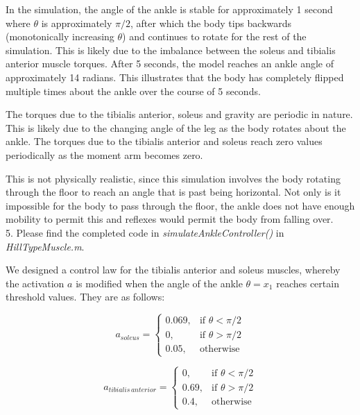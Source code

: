 \documentclass{article}
\begin{document}
In the simulation, the angle of the ankle is stable for approximately 1 second where $\theta$ is approximately $\pi/2$, after which the body tips backwards (monotonically increasing $\theta$) and continues to rotate for the rest of the simulation. This is likely due to the imbalance between the soleus and tibialis anterior muscle torques. After 5 seconds, the model reaches an ankle angle of approximately 14 radians. This illustrates that the body has completely flipped multiple times about the ankle over the course of 5 seconds.

The torques due to the tibialis anterior, soleus and gravity are periodic in nature. This is likely due to the changing angle of the leg as the body rotates about the ankle. The torques due to the tibialis anterior and soleus reach zero values periodically as the moment arm becomes zero.

This is not physically realistic, since this simulation involves the body rotating through the floor to reach an angle that is past being horizontal. Not only is it impossible for the body to pass through the floor, the ankle does not have enough mobility to permit this and reflexes would permit the body from falling over.
\\

5. Please find the completed code in \textit{simulateAnkleController()} in \textit{HillTypeMuscle.m}. 

We designed a control law for the tibialis anterior and soleus muscles, whereby the activation $a$ is modified when the angle of the ankle $\theta = x_1$ reaches certain threshold values. They are as follows:

\begin{equation*}
  a_{soleus}=\begin{cases}
    0.069, & \text{if $\theta < \pi/2$}\\
    0, & \text{if $\theta > \pi/2$}\\
    0.05, & \text{otherwise}
  \end{cases}
\end{equation*}

\begin{equation*}
  a_{tibialis \, anterior}=\begin{cases}
    0, & \text{if $\theta < \pi/2$}\\
    0.69, & \text{if $\theta > \pi/2$}\\
    0.4, & \text{otherwise}
  \end{cases}
\end{equation*}
\end{document}
